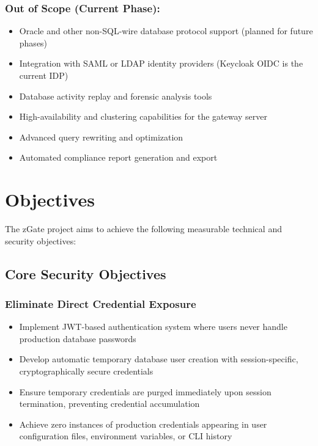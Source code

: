 \subsubsection{Out of Scope (Current Phase):}
\begin{itemize}
    \item Oracle and other non-SQL-wire database protocol support (planned for future phases)
    \item Integration with SAML or LDAP identity providers (Keycloak OIDC is the current IDP)
    \item Database activity replay and forensic analysis tools
    \item High-availability and clustering capabilities for the gateway server
    \item Advanced query rewriting and optimization
    \item Automated compliance report generation and export
\end{itemize}

\section{Objectives}
The zGate project aims to achieve the following measurable technical and security objectives:

\subsection{Core Security Objectives}

\subsubsection{Eliminate Direct Credential Exposure}
\begin{itemize}
    \item Implement JWT-based authentication system where users never handle production database passwords
    \item Develop automatic temporary database user creation with session-specific, cryptographically secure credentials
    \item Ensure temporary credentials are purged immediately upon session termination, preventing credential accumulation
    \item Achieve zero instances of production credentials appearing in user configuration files, environment variables, or CLI history
\end{itemize}

